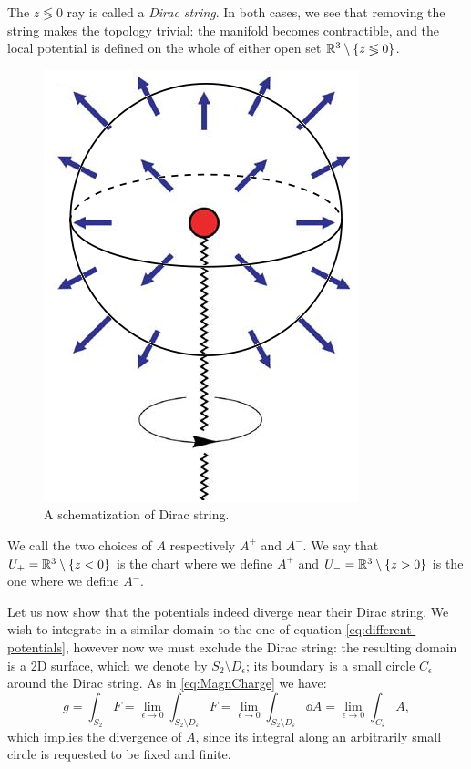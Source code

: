 \documentclass[main.tex]{subfiles}
\begin{document}
%
The \(z \lessgtr 0\) ray is called a \emph{Dirac string}.
%
%
%
In both cases, we see that removing the string makes the topology trivial: the manifold becomes contractible, and the local potential is defined on the whole of either open set $\mathbb{R}^3\setminus \qty{z \lessgtr 0}$.
%
\begin{figure}[h]
\centering
\includegraphics[scale=0.3]{DiracMon.png}
\caption{A schematization of Dirac string.}
\label{fig-DirMon}
\end{figure}

We call the two choices of $A$ respectively $A^+$ and $A^-$.
We say that $U_+ = \mathbb{R}^3 \setminus \qty{z<0}$ is the chart where we define $A^+$ and $U_- = \mathbb{R}^3 \setminus \qty{z>0}$ is the one where we define $A^-$.

Let us now show that the potentials indeed diverge near their Dirac string. We wish to integrate in a similar domain to the one of equation \eqref{eq:different-potentials}, however now we must exclude the Dirac string: the resulting domain is a 2D surface, which we denote by $S_2 \setminus D_\epsilon$; its boundary is a small circle $C_\epsilon$ around the Dirac string. As in \eqref{eq:MagnCharge} we have:
%
\begin{equation}\label{MagCharge}
g=\int_{S_2} F=\lim_{\epsilon\to 0}\int_{S_2\setminus D_{\varepsilon}}F=\lim_{\epsilon\to 0}\int_{S_2\setminus D_{\varepsilon}} \dd{A}=\lim_{\epsilon\to 0}\int_{C_{\varepsilon}} A,
\end{equation}
which implies the divergence of $A$, since its integral along an arbitrarily small circle is requested to be fixed and finite.
\end{document}
